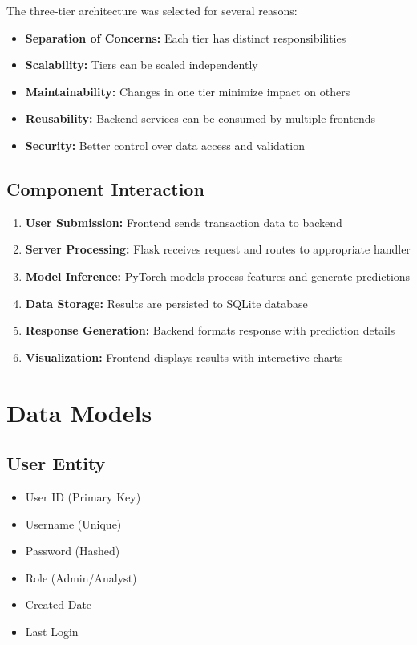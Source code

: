 \documentclass[12pt,a4paper,twoside]{report}
\begin{document}
The three-tier architecture was selected for several reasons:

\begin{itemize}
    \item \textbf{Separation of Concerns:} Each tier has distinct responsibilities
    \item \textbf{Scalability:} Tiers can be scaled independently
    \item \textbf{Maintainability:} Changes in one tier minimize impact on others
    \item \textbf{Reusability:} Backend services can be consumed by multiple frontends
    \item \textbf{Security:} Better control over data access and validation
\end{itemize}

\subsection{Component Interaction}

\begin{enumerate}
    \item \textbf{User Submission:} Frontend sends transaction data to backend
    \item \textbf{Server Processing:} Flask receives request and routes to appropriate handler
    \item \textbf{Model Inference:} PyTorch models process features and generate predictions
    \item \textbf{Data Storage:} Results are persisted to SQLite database
    \item \textbf{Response Generation:} Backend formats response with prediction details
    \item \textbf{Visualization:} Frontend displays results with interactive charts
\end{enumerate}

\section{Data Models}

\subsection{User Entity}

\begin{itemize}
    \item User ID (Primary Key)
    \item Username (Unique)
    \item Password (Hashed)
    \item Role (Admin/Analyst)
    \item Created Date
    \item Last Login
\end{itemize}
\end{document}
